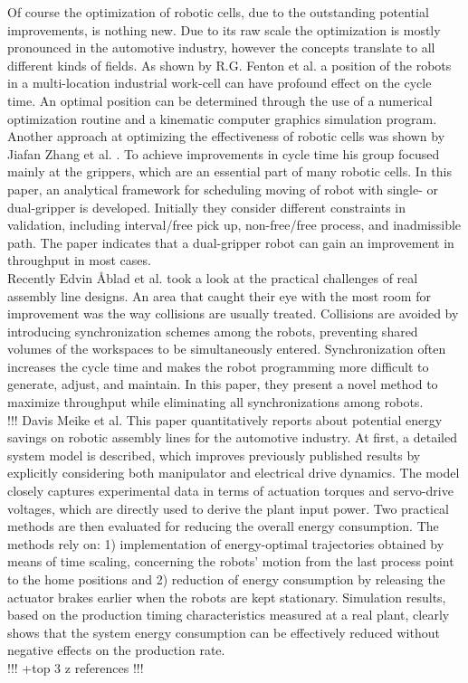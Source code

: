 Of course the optimization of robotic cells, due to the outstanding potential improvements, is nothing new. Due to its raw scale the optimization is mostly pronounced in the automotive industry, however the concepts translate to all different kinds of fields. As shown by R.G. Fenton et al. \cite{OptimizationCycleTimeFenton} a position of the robots in a multi-location industrial work-cell can have profound effect on the cycle time. An optimal position  can be determined through the use of a numerical optimization routine and a kinematic computer graphics simulation program. \\

Another approach at optimizing the effectiveness of robotic cells was shown by Jiafan Zhang et al. \cite{OptimizationCycleTimeZhang}. To achieve improvements in cycle time his group focused mainly at the grippers, which are an essential part of many robotic cells. In this paper, an analytical framework for scheduling moving of robot with single- or dual-gripper is developed. Initially they consider different constraints in validation, including interval/free pick up, non-free/free process, and inadmissible path. The paper indicates that a dual-gripper robot can gain an improvement in throughput in most cases. \\

Recently Edvin Åblad et al. \cite{CollisionAvoidanceAblad} took a look at the practical challenges of real assembly line designs. An area that caught their eye with the most room for improvement was the way collisions are usually treated. Collisions are avoided by introducing synchronization schemes among the robots, preventing shared volumes of the workspaces to be simultaneously entered. Synchronization often increases the cycle time and makes the robot programming more difficult to generate, adjust, and maintain. In this paper, they present a novel method to maximize throughput while eliminating all synchronizations among robots. \\

!!!
Davis Meike et al. \cite{Meike8Percent}
This paper quantitatively reports about potential energy savings on robotic assembly lines for the automotive industry. At first, a detailed system model is described, which improves previously published results by explicitly considering both manipulator and electrical drive dynamics. The model closely captures experimental data in terms of actuation torques and servo-drive voltages, which are directly used to derive the plant input power. Two practical methods are then evaluated for reducing the overall energy consumption. The methods rely on: 1) implementation of energy-optimal trajectories obtained by means of time scaling, concerning the robots' motion from the last process point to the home positions and 2) reduction of energy consumption by releasing the actuator brakes earlier when the robots are kept stationary. Simulation results, based on the production timing characteristics measured at a real plant, clearly shows that the system energy consumption can be effectively reduced without negative effects on the production rate. \\
!!!
+top 3 z references
!!!

